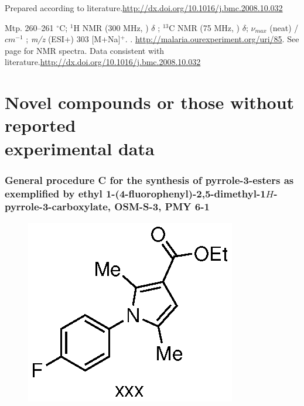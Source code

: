 \documentclass[12pt, a4paper,titlepage]{article}
\begin{document}
Prepared according to literature.\url{http://dx.doi.org/10.1016/j.bmc.2008.10.032}

Mtp. 260--261 $^\circ$C;
$^1$H NMR (300 MHz, ) $\delta$ ; 
$^{13}$C NMR (75 MHz, ) $\delta$;
 $\nu_{max}$ (neat) /$cm^{-1}$ ;
\emph{m/z} (ESI+) 303 [M+Na]$^+$.
.
\url{http://malaria.ourexperiment.org/uri/85}.
See page \pageref{spec:ZYH23} for NMR spectra. Data consistent with literature.\url{http://dx.doi.org/10.1016/j.bmc.2008.10.032}

\section{Novel compounds or those without reported\\ experimental data}

\subsubsection*{General procedure C for the synthesis of pyrrole-3-esters as exemplified by ethyl 1-(4-fluorophenyl)-2,5-dimethyl-1$H$-pyrrole-3-carboxylate, OSM-S-3, PMY 6-1}
\label{exp:PMY6}
	\begin{figure}[H]
	\begin{center}
	\includegraphics{exp/PMY6.eps}
	\end{center}
	\vspace{-25pt}	
	\end{figure}	
\end{document}
